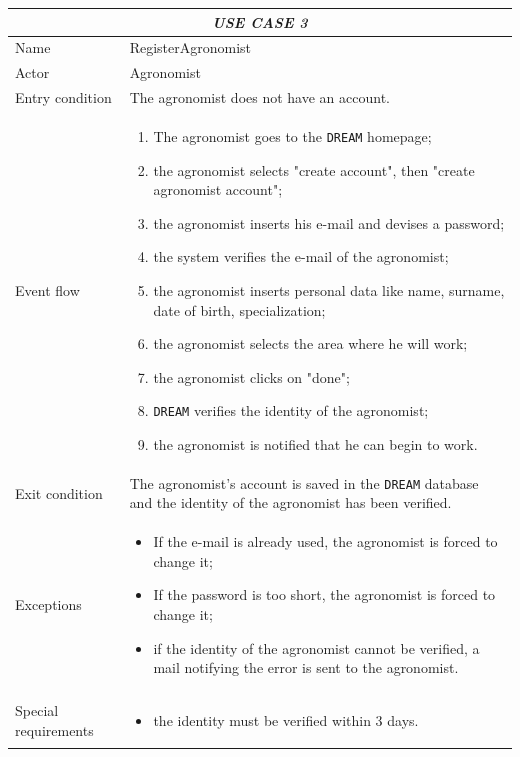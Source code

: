 \documentclass{article}
\begin{document}
\centering
\begin{tabular}{|p{3.5cm}|m{8cm}|}
 \hline
 \multicolumn{2}{|c|}{\emph{USE CASE 3}} \\
 \hline
 Name & RegisterAgronomist\\
 \hline
 Actor & Agronomist\\
 \hline
 Entry condition & The agronomist does not have an account.\\
 \hline
 Event flow & \begin{enumerate}
    \item The agronomist goes to the \verb|DREAM| homepage;
    \item the agronomist selects "create account", then "create agronomist account";
    \item the agronomist inserts his e-mail and devises a password;
    \item the system verifies the e-mail of the agronomist;
    \item the agronomist inserts personal data like name, surname, date of birth, specialization;
    \item the agronomist selects the area where he will work;
    \item the agronomist clicks on "done";
    \item \verb|DREAM| verifies the identity of the agronomist;
    \item the agronomist is notified that he can begin to work.
 \end{enumerate}\\
 \hline
 Exit condition & The agronomist's account is saved in the \verb|DREAM| database and the identity of the agronomist has been verified.\\
 \hline
 Exceptions & \begin{itemize}
     \item If the e-mail is already used, the agronomist is forced to change it;
     \item If the password is too short, the agronomist is forced to change it;
     \item if the identity of the agronomist cannot be verified, a mail notifying the error is sent to the agronomist.
 \end{itemize}\\
 \hline
 Special requirements & \begin{itemize}
     \item the identity must be verified within 3 days.
 \end{itemize}\\
 \hline
\end{tabular}
\end{document}
